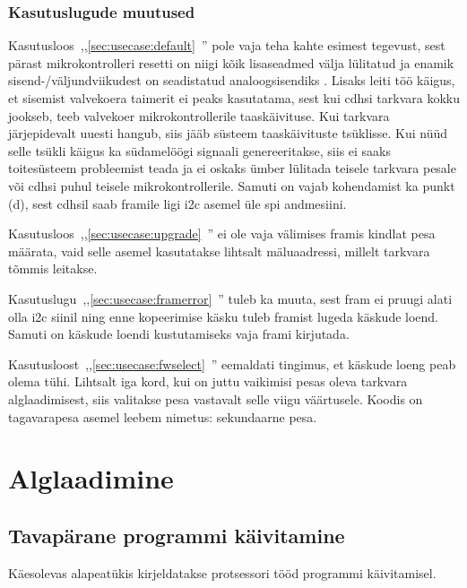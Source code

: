 \documentclass[12pt,a4paper]{article}
\begin{document}
\subsubsection{Kasutuslugude muutused}
Kasutusloos~,,\ref{sec:usecase:default}~'' pole
vaja teha kahte esimest tegevust, sest pärast mikrokontrolleri resetti on niigi
kõik lisaseadmed välja lülitatud ja enamik sisend-/väljundviikudest on
seadistatud analoogsisendiks \cite{f1rm,f2rm}. Lisaks leiti töö käigus, et
sisemist valvekoera taimerit ei peaks kasutatama, sest kui \gls{cdhs}i tarkvara
kokku jookseb, teeb valvekoer mikrokontrollerile taaskäivituse. Kui tarkvara
järjepidevalt uuesti hangub, siis jääb süsteem taaskäivituste tsüklisse. Kui
nüüd selle tsükli käigus ka südamelöögi signaali genereeritakse, siis ei saaks
toitesüsteem probleemist teada ja ei oskaks ümber lülitada teisele tarkvara
pesale või \gls{cdhs}i puhul teisele mikrokontrollerile. Samuti on vajab
kohendamist ka punkt (d), sest \gls{cdhs}il saab \gls{fram}ile ligi \gls{i2c} asemel
üle \gls{spi} andmesiini.

Kasutusloos~,,\ref{sec:usecase:upgrade}~'' ei ole
vaja välimises \gls{fram}is kindlat pesa määrata, vaid selle asemel kasutatakse
lihtsalt mälu\-aadressi, millelt tarkvara tõmmis leitakse.

Kasutuslugu~,,\ref{sec:usecase:framerror}~''
tuleb ka muuta, sest \gls{fram} ei pruugi alati olla \gls{i2c} siinil ning enne
kopeerimise käsku tuleb \gls{fram}ist lugeda käskude loend. Samuti on käskude
loendi kustutamiseks vaja \gls{fram}i kirjutada.

Kasutusloost~,,\ref{sec:usecase:fwselect}~''
eemaldati tingimus, et käskude loeng peab olema tühi.  Lihtsalt iga kord, kui on
juttu vaikimisi pesas oleva tarkvara alglaadimisest, siis valitakse pesa
vastavalt selle viigu väärtusele. Koodis on tagavarapesa asemel leebem nimetus:
sekundaarne pesa.

\section{Alglaadimine}
\label{sec:boot}
\subsection{Tavapärane programmi käivitamine}
\label{sec:boot:tava}
Käesolevas alapeatükis kirjeldatakse protsessori tööd programmi käivitamisel.
\end{document}

